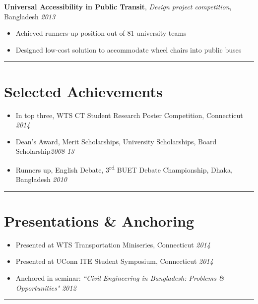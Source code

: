 \documentclass[margin]{res}%
\begin{document}
\begin{resume}
{\bf Universal Accessibility in Public Transit}, \emph{Design project competition}, Bangladesh \hfill \emph{2013}
\begin{itemize} \itemsep -2.25pt
	\item Achieved runners-up position out of 81 university teams 
	\item Designed low-cost solution to accommodate wheel chairs into public buses
	\end{itemize}	


\vspace{-1.9em}
\noindent\rule{\textwidth}{0.4pt}
\vspace{-1.85em}


\section {Selected Achievements} 
\begin{itemize} \itemsep -2.3pt
	\item In top three, WTS CT Student Research Poster Competition, Connecticut \hfill \emph{2014}
	\item Dean's Award, Merit Scholarships, University Scholarships, Board Scholarship\hfill\emph{2008-13}
	\item Runners up, English Debate, 3\textsuperscript{rd} BUET Debate Championship, Dhaka, Bangladesh \hfill \emph{2010}
\end{itemize}	



\vspace{-1.9em}
\noindent\rule{\textwidth}{0.4pt}
\vspace{-1.85em}

\section {Presentations \& Anchoring}{}
\begin{itemize} \itemsep -2.3pt
	\item Presented at WTS Transportation Miniseries, Connecticut \hfill \emph{2014}
	\item Presented at UConn ITE Student Symposium, Connecticut \hfill \emph{2014}
	\item Anchored in seminar: \emph{``Civil Engineering in Bangladesh: Problems \& Opportunities"} \hfill \emph{2012}
\end{itemize}	

\vspace{-1.8em}
\noindent\rule{\textwidth}{0.4pt}
\vspace{-1.75em}



\end{resume}
\end{document}
